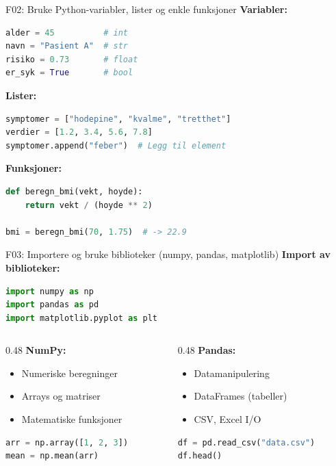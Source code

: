 \documentclass[aspectratio=169, 10pt]{beamer}
\begin{document}
\begin{frame}[fragile]{F02: Bruke Python-variabler, lister og enkle funksjoner}
    \textbf{Variabler:}
    \begin{lstlisting}[language=Python]
alder = 45          # int
navn = "Pasient A"  # str
risiko = 0.73       # float
er_syk = True       # bool
    \end{lstlisting}
    
    \textbf{Lister:}
    \begin{lstlisting}[language=Python]
symptomer = ["hodepine", "kvalme", "tretthet"]
verdier = [1.2, 3.4, 5.6, 7.8]
symptomer.append("feber")  # Legg til element
    \end{lstlisting}
    
    \textbf{Funksjoner:}
    \begin{lstlisting}[language=Python]
def beregn_bmi(vekt, hoyde):
    return vekt / (hoyde ** 2)

bmi = beregn_bmi(70, 1.75)  # -> 22.9
    \end{lstlisting}
\end{frame}

\begin{frame}[fragile]{F03: Importere og bruke biblioteker (numpy, pandas, matplotlib)}
    \textbf{Import av biblioteker:}
    \begin{lstlisting}[language=Python]
import numpy as np
import pandas as pd
import matplotlib.pyplot as plt
    \end{lstlisting}
    
    \vspace{0.3cm}
    \begin{columns}[T]
        \begin{column}{0.48\textwidth}
            \textbf{NumPy:}
            \begin{itemize}
                \item Numeriske beregninger
                \item Arrays og matriser
                \item Matematiske funksjoner
            \end{itemize}
            \begin{lstlisting}[language=Python]
arr = np.array([1, 2, 3])
mean = np.mean(arr)
            \end{lstlisting}
        \end{column}
        \begin{column}{0.48\textwidth}
            \textbf{Pandas:}
            \begin{itemize}
                \item Datamanipulering
                \item DataFrames (tabeller)
                \item CSV, Excel I/O
            \end{itemize}
            \begin{lstlisting}[language=Python]
df = pd.read_csv("data.csv")
df.head()
            \end{lstlisting}
        \end{column}
    \end{columns}
\end{frame}
\end{document}
